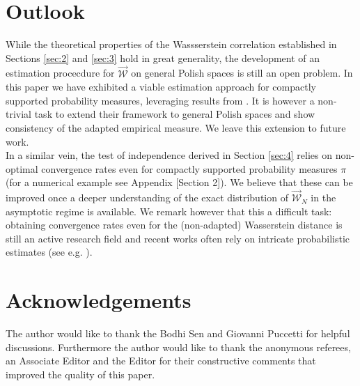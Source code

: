 \documentclass[10pt]{amsart}
\begin{document}
\section{Outlook}\label{sec:8}

While the theoretical properties of the Wassserstein correlation established in Sections \ref{sec:2} and \ref{sec:3} hold in great generality, the development of an estimation procecdure for $\overrightarrow{\mathcal{W}}$ on general Polish spaces is still an open problem. In this paper we have exhibited a viable estimation approach for compactly supported probability measures, leveraging results from \cite{backhoff2020estimating}. It is however a non-trivial task to extend their framework to general Polish spaces and show consistency of the adapted empirical measure. We leave this extension to future work.\\
In a similar vein, the test of independence derived in Section \ref{sec:4} relies on non-optimal convergence rates even for compactly supported probability measures $\pi$ (for a numerical example see Appendix \cite{jwb}[Section 2]). We believe that these can be improved once a deeper understanding of the exact distribution of $\overrightarrow{\mathcal{W}}_N$ in the asymptotic regime is available. We remark however that this a difficult task: obtaining convergence rates even for the (non-adapted) Wasserstein distance is still an active research field and recent works often rely on intricate probabilistic estimates (see e.g. \cite{fournier2015rate,sommerfeld2016inference}).
 
\section{Acknowledgements}
The author would like to thank the Bodhi Sen and Giovanni Puccetti for helpful discussions. Furthermore the author would like to thank the anonymous referees, an Associate Editor and the Editor for their constructive comments that improved the quality of this paper. 





\end{document}
